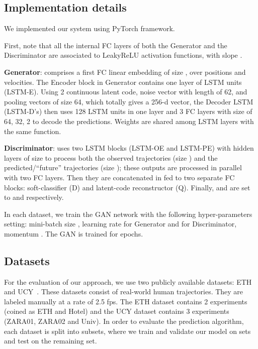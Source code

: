 \documentclass[10pt,twocolumn,letterpaper]{article}
\begin{document}
\def \xPredH {\mathbf{\hat{x}}^i_{1: T}}
\def \XPredH {\mathbf{\hat{X}}^{-i}_{1: T}}

\def \TEOM {\mathbf{\hat{m}}^i_{1: T}}
 \subsection{Implementation details}
\label{subsec:implementation}
We implemented our system using PyTorch framework.

First, note that all the internal FC layers of both the Generator and the Discriminator are associated to  LeakyReLU activation functions, with slope . 

{\textbf{Generator}: comprises a first FC linear embedding  of size , over positions and velocities. The Encoder block in Generator contains one layer of  LSTM units (LSTM-E). Using 2 continuous latent code, noise vector with length of 62, and pooling vectors of size 64, which totally gives a 256-d vector, the Decoder LSTM (LSTM-D's) then uses 128 LSTM units in one layer and 3 FC layers with size of 64, 32, 2 to decode the predictions.} Weights are shared among LSTM layers with the same function.

\textbf{Discriminator}: uses two LSTM blocks (LSTM-OE and LSTM-PE) with hidden layers of size  to process both the observed trajectories (size ) and the predicted/``future'' trajectories (size ); these outputs are processed in parallel with two  FC layers. Then they are concatenated in fed to two separate FC blocks: soft-classifier (D)  and latent-code reconstructor  (Q). Finally,  and  are set to  and  respectively.

 In each dataset, we train the GAN network with the following hyper-parameters setting: mini-batch size , learning rate  for Generator and  for Discriminator, momentum . The GAN is trained for  epochs.

\subsection{Datasets}

For the evaluation of our approach, we use two publicly
available datasets: ETH~\cite{Pellegrini2009} and UCY~\cite{CrowdsByExample2007}. These datasets consist of real-world human trajectories. They are labeled manually at a rate of 2.5 fps. The ETH dataset contains 2 experiments (coined as ETH and Hotel) and the UCY dataset contains 3 experiments (ZARA01, ZARA02 and Univ).
In order to evaluate the prediction algorithm, each dataset is split into  subsets, where we train and validate our model on  sets and test on the remaining set. 
\end{document}
